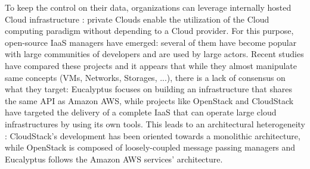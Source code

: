To keep the control on their data, organizations can leverage internally hosted 
Cloud infrastructure : private Clouds enable the utilization of the Cloud 
computing paradigm without depending to a Cloud provider. For this purpose, 
open-source IaaS managers have emerged: several of them have become popular with
large communities of developers and are used by large actors. Recent studies 
\cite{peng:2009} have compared these projects and it appears that while they 
almost manipulate same concepts (VMs, Networks, Storages, ...), there is a lack 
of consensus on what they target: Eucalyptus focuses on building an 
infrastructure that shares the same API as Amazon AWS, while projects like 
OpenStack and CloudStack have targeted the delivery of a complete IaaS that can
operate large cloud infrastructures by using its own tools. This leads to an 
architectural heterogeneity : CloudStack’s development has been oriented towards
a monolithic architecture, while OpenStack is composed of loosely-coupled 
message passing managers and Eucalyptus follows the Amazon AWS services’
architecture.

